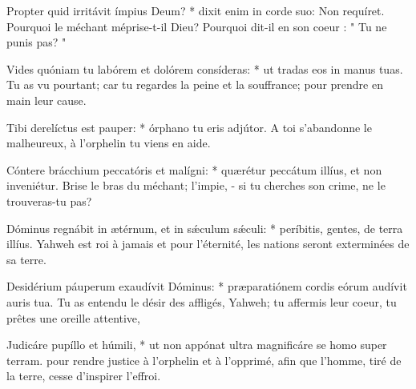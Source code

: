 \begin{paracol}{2}
\LigneParacol
{Propter quid irritávit ímpius Deum? * dixit enim in corde suo: Non requíret.}
{Pourquoi le méchant méprise-t-il Dieu? Pourquoi dit-il en son coeur : " Tu ne punis pas? " }

\LigneParacol
{Vides quóniam tu labórem et dolórem consíderas: * ut tradas eos in manus tuas.}
{Tu as vu pourtant; car tu regardes la peine et la souffrance; pour prendre en main leur cause.}

\LigneParacol
{Tibi derelíctus est pauper: * órphano tu eris adjútor.}
{A toi s'abandonne le malheureux, à l'orphelin tu viens en aide. }

\LigneParacol
{Cóntere brácchium peccatóris et malígni: * quærétur peccátum illíus, et non inveniétur.}
{Brise le bras du méchant; l'impie, - si tu cherches son crime, ne le trouveras-tu pas?}

\LigneParacol
{Dóminus regnábit in ætérnum, et in sǽculum sǽculi: * períbitis, gentes, de terra illíus.}
{Yahweh est roi à jamais et pour l'éternité, les nations seront exterminées de sa terre. }

\LigneParacol
{Desidérium páuperum exaudívit Dóminus: * præparatiónem cordis eórum audívit auris tua.}
{Tu as entendu le désir des affligés, Yahweh; tu affermis leur coeur, tu prêtes une oreille attentive, }

\LigneParacol
{Judicáre pupíllo et húmili, * ut non appónat ultra magnificáre se homo super terram.}
{pour rendre justice à l'orphelin et à l'opprimé, afin que l'homme, tiré de la terre, cesse d'inspirer l'effroi. }

\end{paracol}
